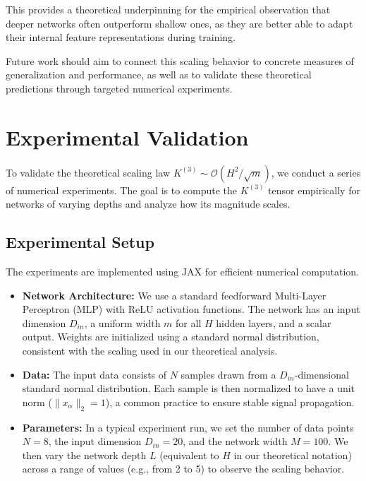 \documentclass{article}
\newcommand{\Order}{\mathcal{O}}
\begin{document}
This provides a theoretical underpinning for the empirical observation that deeper networks often outperform shallow ones, as they are better able to adapt their internal feature representations during training.

Future work should aim to connect this scaling behavior to concrete measures of generalization and performance, as well as to validate these theoretical predictions through targeted numerical experiments.

\section{Experimental Validation}

To validate the theoretical scaling law $K^{(3)} \sim \Order(H^2/\sqrt{m})$, we conduct a series of numerical experiments. The goal is to compute the $K^{(3)}$ tensor empirically for networks of varying depths and analyze how its magnitude scales.

\subsection{Experimental Setup}

The experiments are implemented using JAX for efficient numerical computation.

\begin{itemize}
    \item \textbf{Network Architecture:} We use a standard feedforward Multi-Layer Perceptron (MLP) with ReLU activation functions. The network has an input dimension $D_{in}$, a uniform width $m$ for all $H$ hidden layers, and a scalar output. Weights are initialized using a standard normal distribution, consistent with the scaling used in our theoretical analysis.

    \item \textbf{Data:} The input data consists of $N$ samples drawn from a $D_{in}$-dimensional standard normal distribution. Each sample is then normalized to have a unit norm ($\|x_\alpha\|_2 = 1$), a common practice to ensure stable signal propagation.

    \item \textbf{Parameters:} In a typical experiment run, we set the number of data points $N=8$, the input dimension $D_{in}=20$, and the network width $M=100$. We then vary the network depth $L$ (equivalent to $H$ in our theoretical notation) across a range of values (e.g., from 2 to 5) to observe the scaling behavior.
\end{itemize}
\end{document}
